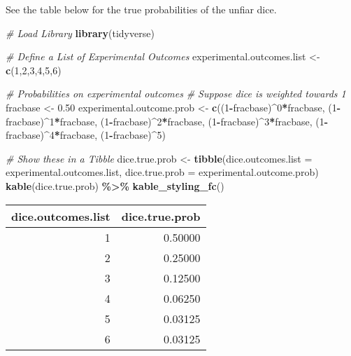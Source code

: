 \documentclass[
]{book}
\newenvironment{Shaded}{\begin{snugshade}}{\end{snugshade}}
\newcommand{\CommentTok}[1]{\textcolor[rgb]{0.56,0.35,0.01}{\textit{#1}}}
\newcommand{\DataTypeTok}[1]{\textcolor[rgb]{0.13,0.29,0.53}{#1}}
\newcommand{\DecValTok}[1]{\textcolor[rgb]{0.00,0.00,0.81}{#1}}
\newcommand{\FloatTok}[1]{\textcolor[rgb]{0.00,0.00,0.81}{#1}}
\newcommand{\KeywordTok}[1]{\textcolor[rgb]{0.13,0.29,0.53}{\textbf{#1}}}
\newcommand{\NormalTok}[1]{#1}
\newcommand{\OperatorTok}[1]{\textcolor[rgb]{0.81,0.36,0.00}{\textbf{#1}}}
\newcommand{\StringTok}[1]{\textcolor[rgb]{0.31,0.60,0.02}{#1}}
\begin{document}
See the table below for the true probabilities of the unfiar dice.

\begin{Shaded}
\begin{Highlighting}[]
\CommentTok{\# Load Library}
\KeywordTok{library}\NormalTok{(tidyverse)}

\CommentTok{\# Define a List of Experimental Outcomes}
\NormalTok{experimental.outcomes.list \textless{}{-}}\StringTok{ }\KeywordTok{c}\NormalTok{(}\DecValTok{1}\NormalTok{,}\DecValTok{2}\NormalTok{,}\DecValTok{3}\NormalTok{,}\DecValTok{4}\NormalTok{,}\DecValTok{5}\NormalTok{,}\DecValTok{6}\NormalTok{)}

\CommentTok{\# Probabilities on experimental outcomes}
\CommentTok{\# Suppose dice is weighted towards 1}
\NormalTok{fracbase \textless{}{-}}\StringTok{ }\FloatTok{0.50}
\NormalTok{experimental.outcome.prob \textless{}{-}}\StringTok{ }\KeywordTok{c}\NormalTok{((}\DecValTok{1}\OperatorTok{{-}}\NormalTok{fracbase)}\OperatorTok{\^{}}\DecValTok{0}\OperatorTok{*}\NormalTok{fracbase,}
\NormalTok{                               (}\DecValTok{1}\OperatorTok{{-}}\NormalTok{fracbase)}\OperatorTok{\^{}}\DecValTok{1}\OperatorTok{*}\NormalTok{fracbase,}
\NormalTok{                               (}\DecValTok{1}\OperatorTok{{-}}\NormalTok{fracbase)}\OperatorTok{\^{}}\DecValTok{2}\OperatorTok{*}\NormalTok{fracbase,}
\NormalTok{                               (}\DecValTok{1}\OperatorTok{{-}}\NormalTok{fracbase)}\OperatorTok{\^{}}\DecValTok{3}\OperatorTok{*}\NormalTok{fracbase,}
\NormalTok{                               (}\DecValTok{1}\OperatorTok{{-}}\NormalTok{fracbase)}\OperatorTok{\^{}}\DecValTok{4}\OperatorTok{*}\NormalTok{fracbase,}
\NormalTok{                               (}\DecValTok{1}\OperatorTok{{-}}\NormalTok{fracbase)}\OperatorTok{\^{}}\DecValTok{5}\NormalTok{)}

\CommentTok{\# Show these in a Tibble}
\NormalTok{dice.true.prob \textless{}{-}}\StringTok{ }\KeywordTok{tibble}\NormalTok{(}\DataTypeTok{dice.outcomes.list =}\NormalTok{ experimental.outcomes.list,}
                         \DataTypeTok{dice.true.prob =}\NormalTok{ experimental.outcome.prob)}
\KeywordTok{kable}\NormalTok{(dice.true.prob) }\OperatorTok{\%\textgreater{}\%}\StringTok{ }\KeywordTok{kable\_styling\_fc}\NormalTok{()}
\end{Highlighting}
\end{Shaded}

\begin{table}[!h]
\centering
\begin{tabular}{r|r}
\hline
dice.outcomes.list & dice.true.prob\\
\hline
\rowcolor{gray!6}  1 & 0.50000\\
\hline
2 & 0.25000\\
\hline
\rowcolor{gray!6}  3 & 0.12500\\
\hline
4 & 0.06250\\
\hline
\rowcolor{gray!6}  5 & 0.03125\\
\hline
6 & 0.03125\\
\hline
\end{tabular}
\end{table}
\end{document}
